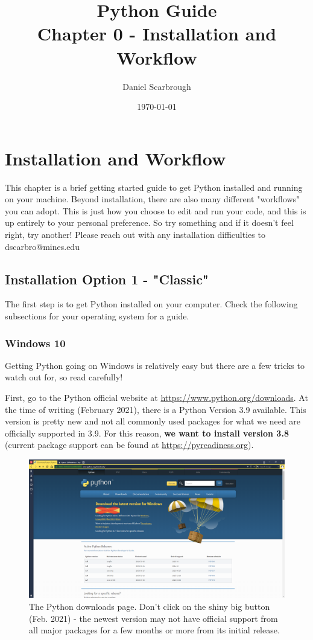 \documentclass[oneside]{book}
\title{Python Guide\\Chapter 0 - Installation and Workflow}
\author{Daniel Scarbrough}
\date{\today}
\begin{document}
\maketitle

\tableofcontents

\chapter{Installation and Workflow}
This chapter is a brief getting started guide to get Python installed and running on your machine. Beyond installation, there are also many different "workflows" you can adopt. This is just how you choose to edit and run your code, and this is up entirely to your personal preference. So try something and if it doesn't feel right, try another! Please reach out with any installation difficulties to dscarbro@mines.edu

\section{Installation Option 1 - "Classic"}
The first step is to get Python installed on your computer. Check the following subsections for your operating system for a guide.

\subsection{Windows 10}
Getting Python going on Windows is relatively easy but there are a few tricks to watch out for, so read carefully! 

First, go to the Python official website at \url{https://www.python.org/downloads}. At the time of writing (February 2021), there is a Python Version 3.9 available. This version is pretty new and not all commonly used packages for what we need are officially supported in 3.9. For this reason, \textbf{we want to install version 3.8} (current package support can be found at \url{https://pyreadiness.org}).

\begin{figure}[H]
\centering
\includegraphics[width=0.7\linewidth]{./img/pyDownloadStart.PNG}
\caption{The Python downloads page. Don't click on the shiny big button (Feb. 2021) - the newest version may not have official support from all major packages for a few months or more from its initial release.}
\label{fig:pyhomepage}
\end{figure}
\end{document}
